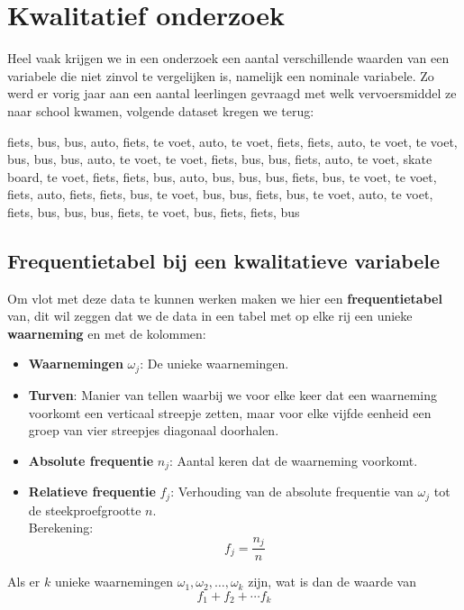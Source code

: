 \documentclass[12pt,twoside]{article}
\begin{document}
\pagebreak
\section{Kwalitatief onderzoek}

Heel vaak krijgen we in een onderzoek een aantal verschillende waarden van een variabele die niet zinvol te vergelijken is, namelijk een nominale variabele. Zo werd er vorig jaar aan een aantal leerlingen gevraagd met welk vervoersmiddel ze naar school kwamen, volgende dataset kregen we terug:
\begin{center}
fiets, bus, bus, auto, fiets, te voet, auto, te voet, fiets, fiets, auto, te voet, te voet, bus, bus, bus, auto, te voet, te voet, fiets, bus, bus, fiets, auto, te voet, skate board, te voet, fiets, fiets, bus, auto, bus, bus, bus, fiets, bus, te voet, te voet, fiets, auto, fiets, fiets, bus, te voet, bus, bus, fiets, bus, te voet, auto, te voet, fiets, bus, bus, bus, fiets, te voet, bus, fiets, fiets, bus 
\end{center}

\subsection{Frequentietabel bij een kwalitatieve variabele}

Om vlot met deze data te kunnen werken maken we hier een {\bf frequentietabel} van, dit wil zeggen dat we de data in een tabel met op elke rij een unieke {\bf waarneming} en met de kolommen:
\begin{itemize}
  \item {\bf Waarnemingen} $\omega_j$: De unieke waarnemingen.
  \item {\bf Turven}: Manier van tellen waarbij we voor elke keer dat een waarneming voorkomt een verticaal streepje zetten, maar voor elke vijfde eenheid een groep van vier streepjes diagonaal doorhalen.
  \item {\bf Absolute frequentie} $n_j$: Aantal keren dat de waarneming voorkomt.
  \item {\bf Relatieve frequentie} $f_j$: Verhouding van de absolute frequentie van $\omega_j$ tot de steekproefgrootte $n$.\\
  Berekening: $$f_j=\dfrac{n_j}{n}$$
\end{itemize}

\begin{oefening}
Als er $k$ unieke waarnemingen $\omega_1, \omega_2, \ldots, \omega_k$ zijn, wat is dan de waarde van
$$f_1 + f_2 + \cdots f_k$$
\end{oefening}
\end{document}
